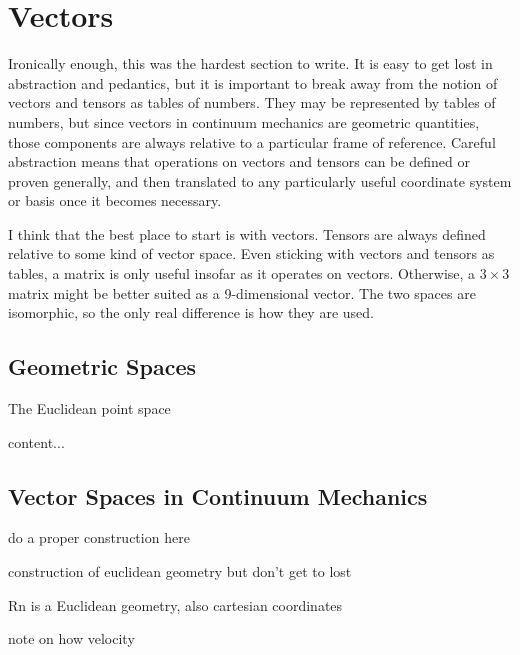 \chapter{Vectors}
\label{chapter:Vectors}


Ironically enough, this was the hardest section to write. It is easy to get lost in abstraction and pedantics, but it is important to break away from the notion of vectors and tensors as tables of numbers. They may be represented by tables of numbers, but since vectors in continuum mechanics are geometric quantities, those components are always relative to a particular frame of reference. Careful abstraction means that operations on vectors and tensors can be defined or proven generally, and then translated to any particularly useful coordinate system or basis once it becomes necessary.

I think that the best place to start is with vectors. Tensors are always defined relative to some kind of vector space. Even sticking with vectors and tensors as tables, a matrix is only useful insofar as it operates on vectors. Otherwise, a $3 \times 3$ matrix might be better suited as a 9-dimensional vector. The two spaces are isomorphic, so the only real difference is how they are used.

\section{Geometric Spaces}

\begin{definition}
	The Euclidean point space
\end{definition}

\begin{definition}
	content...
\end{definition}

\section{Vector Spaces in Continuum Mechanics}

do a proper construction here

construction of euclidean geometry but don't get to lost

Rn is a Euclidean geometry, also cartesian coordinates

note on how velocity

